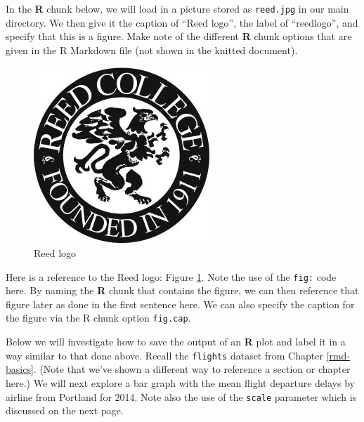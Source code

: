 \documentclass[12pt,twoside]{reedthesis}
\theoremstyle{definition}
\theoremstyle{definition}
\theoremstyle{remark}
\begin{document}
  In the \textbf{R} chunk below, we will load in a picture stored as
  \texttt{reed.jpg} in our main directory. We then give it the caption of
  ``Reed logo'', the label of ``reedlogo'', and specify that this is a
  figure. Make note of the different \textbf{R} chunk options that are
  given in the R Markdown file (not shown in the knitted document).
  
  \begin{Shaded}
  \begin{Highlighting}[]
  \NormalTok{(} \NormalTok{)}
  \end{Highlighting}
  \end{Shaded}
  
  \begin{figure}[htbp]
  \centering
  \includegraphics{figure/reed.jpg}
  \caption{\label{fig:reedlogo}Reed logo}
  \end{figure}
  
  Here is a reference to the Reed logo: Figure \ref{fig:reedlogo}. Note
  the use of the \texttt{fig:} code here. By naming the \textbf{R} chunk
  that contains the figure, we can then reference that figure later as
  done in the first sentence here. We can also specify the caption for the
  figure via the R chunk option \texttt{fig.cap}.
  
  \clearpage 
  
  Below we will investigate how to save the output of an \textbf{R} plot
  and label it in a way similar to that done above. Recall the
  \texttt{flights} dataset from Chapter \ref{rmd-basics}. (Note that we've
  shown a different way to reference a section or chapter here.) We will
  next explore a bar graph with the mean flight departure delays by
  airline from Portland for 2014. Note also the use of the \texttt{scale}
  parameter which is discussed on the next page.
  
\end{document}
